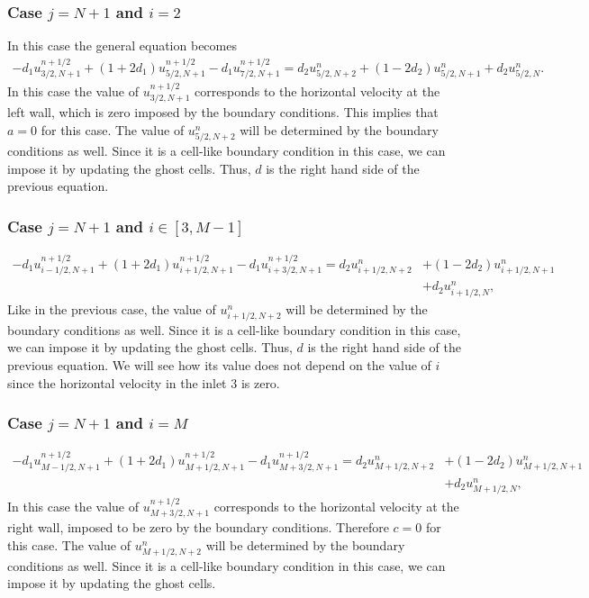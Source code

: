 \subsubsection*{Case $j=N+1$ and $i=2$}
In this case the general equation becomes
\begin{align*}
-d_1u_{3/2,N+1}^{n+1/2}+(1+2d_1)u_{5/2,N+1}^{n+1/2}-d_1u_{7/2,N+1}^{n+1/2}=d_2u_{5/2,N+2}^{n}+(1-2d_2)u_{5/2,N+1}^{n}+d_2u_{5/2,N}^{n}.
\end{align*}
In this case the value of $u_{3/2,N+1}^{n+1/2}$ corresponds to the horizontal velocity at the left wall, which is zero imposed by the boundary conditions. This implies that $a=0$ for this case. The value of $u_{5/2,N+2}^{n}$ will be determined by the boundary conditions as well. Since it is a cell-like boundary condition in this case, we can impose it by updating the ghost cells. Thus, $d$ is the right hand side of the previous equation.

\subsubsection*{Case $j=N+1$ and $i\in[3,M-1]$}
\begin{align*}
-d_1u_{i-1/2,N+1}^{n+1/2}+(1+2d_1)u_{i+1/2,N+1}^{n+1/2}-d_1u_{i+3/2,N+1}^{n+1/2}=d_2u_{i+1/2,N+2}^{n}&+(1-2d_2)u_{i+1/2,N+1}^{n}\\&+d_2u_{i+1/2,N}^{n},
\end{align*}
Like in the previous case, the value of $u_{i+1/2,N+2}^{n}$ will be determined by the boundary conditions as well. Since it is a cell-like boundary condition in this case, we can impose it by updating the ghost cells. Thus, $d$ is the right hand side of the previous equation. We will see how its value does not depend on the value of $i$ since the horizontal velocity in the inlet 3 is zero.

\subsubsection*{Case $j=N+1$ and $i=M$}
\begin{align*}
-d_1u_{M-1/2,N+1}^{n+1/2}+(1+2d_1)u_{M+1/2,N+1}^{n+1/2}-d_1u_{M+3/2,N+1}^{n+1/2}=d_2u_{M+1/2,N+2}^{n}&+(1-2d_2)u_{M+1/2,N+1}^{n}\\&+d_2u_{M+1/2,N}^{n},
\end{align*}
In this case the value of $u_{M+3/2,N+1}^{n+1/2}$ corresponds to the horizontal velocity at the right wall, imposed to be zero by the boundary conditions. Therefore $c=0$ for this case. The value of $u_{M+1/2,N+2}^{n}$ will be determined by the boundary conditions as well. Since it is a cell-like boundary condition in this case, we can impose it by updating the ghost cells.

